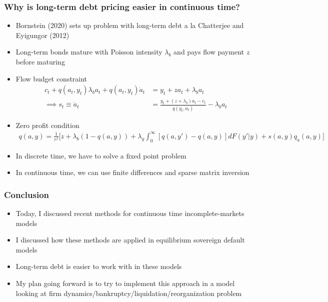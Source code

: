 \documentclass[usenames,dvipsnames, handout, aspectratio=169]{beamer}
\begin{document}
\begin{frame}[label = bornstein_summary_3]
\frametitle{Why is long-term debt pricing easier in continuous time?}
\small
\begin{itemize}
\item Bornstein (2020) sets up problem with long-term debt a la Chatterjee and Eyigungor (2012)
\item Long-term bonds mature with Poisson intensity $\lambda_b$ and pays flow payment $z$ before maturing
\item Flow budget constraint 
\begin{align*}
c_t  + q(a_t, y_t) \lambda_b a_t + q(a_t, y_t) \dot a_t &= y_t + za_t + \lambda_b a_t\\
\implies
s_t \equiv \dot a_t &= \frac{y_t + (z + \lambda_b) a_t - c_t}{q(y_t, a_t)} - \lambda_b a_t
\end{align*}
\item Zero profit condition
\begin{align*}
q(a, y) = \frac{1}{r^f}\Bigg[z + \lambda_b(1-q(a, y)) + \lambda_y \int_0^\infty [q(a, y') - q(a, y)] dF(y'|y) + s(a, y) q_a(a, y) \Bigg]
\end{align*}
\item In discrete time, we have to solve a fixed point problem
\item In continuous time, we can use finite differences and sparse matrix inversion
\end{itemize}
\end{frame}


\begin{frame}[label = conclusion]
\frametitle{Conclusion}
\small
\begin{itemize}
\item Today, I discussed recent methods for continuous time incomplete-markets models
\item I discussed how these methods are applied in equilibrium sovereign default models
\item Long-term debt is easier to work with in these models
\item My plan going forward is to try to implement this approach in a model looking at firm dynamics/bankruptcy/liquidation/reorganization problem
\end{itemize}
\end{frame}
\end{document}
